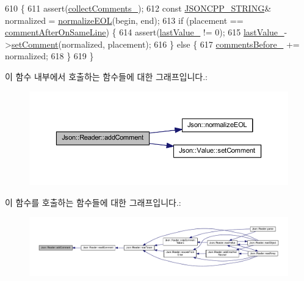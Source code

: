 \begin{DoxyCode}
610                                                                            \{
611   assert(\hyperlink{class_json_1_1_reader_a8e9ce743f6004f0596692f0a9ee4626c}{collectComments\_});
612   \textcolor{keyword}{const} \hyperlink{json-forwards_8h_a1e723f95759de062585bc4a8fd3fa4be}{JSONCPP\_STRING}& normalized = \hyperlink{namespace_json_a63123f3dd63f340ac517a59f44ea7aa4}{normalizeEOL}(begin, end);
613   \textcolor{keywordflow}{if} (placement == \hyperlink{namespace_json_a4fc417c23905b2ae9e2c47d197a45351a008a230a0586de54f30b76afe70fdcfa}{commentAfterOnSameLine}) \{
614     assert(\hyperlink{class_json_1_1_reader_a87cc75ae5adc6a6755f0ba1c7255ff6c}{lastValue\_} != 0);
615     \hyperlink{class_json_1_1_reader_a87cc75ae5adc6a6755f0ba1c7255ff6c}{lastValue\_}->\hyperlink{class_json_1_1_value_a29f3a30f7e5d3af6f38d57999bf5b480}{setComment}(normalized, placement);
616   \} \textcolor{keywordflow}{else} \{
617     \hyperlink{class_json_1_1_reader_af777967adaf0b2e882efa07673754381}{commentsBefore\_} += normalized;
618   \}
619 \}
\end{DoxyCode}
이 함수 내부에서 호출하는 함수들에 대한 그래프입니다.\+:\nopagebreak
\begin{figure}[H]
\begin{center}
\leavevmode
\includegraphics[width=350pt]{class_json_1_1_reader_aaea3bd62d12ffb6117a61476c0685049_cgraph}
\end{center}
\end{figure}
이 함수를 호출하는 함수들에 대한 그래프입니다.\+:\nopagebreak
\begin{figure}[H]
\begin{center}
\leavevmode
\includegraphics[width=350pt]{class_json_1_1_reader_aaea3bd62d12ffb6117a61476c0685049_icgraph}
\end{center}
\end{figure}
\mbox{\label{class_json_1_1_reader_af02176a1d2786b4415bbb00a1b10bb6b}} 
